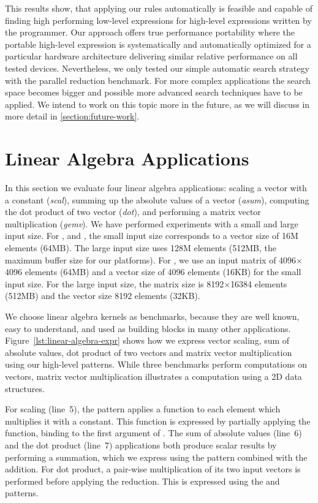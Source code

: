 \bigskip

\noindent
This results show, that applying our rules automatically is feasible and capable of finding high performing low-level expressions for high-level expressions written by the programmer.
Our approach offers true performance portability where the portable high-level expression is systematically and automatically optimized for a particular hardware architecture delivering similar relative performance on all tested devices.
Nevertheless, we only tested our simple automatic search strategy with the parallel reduction benchmark.
For more complex applications the search space becomes bigger and possible more advanced search techniques have to be applied.
We intend to work on this topic more in the future, as we will discuss in more detail in \autoref{section:future-work}.




\section{Linear Algebra Applications}

In this section we evaluate four linear algebra applications: scaling a vector with a constant (\emph{scal}), summing up the absolute values of a vector (\emph{asum}), computing the dot product of two vector (\emph{dot}), and performing a matrix vector multiplication (\emph{gemv}).
We have performed experiments with a small and large input size.
For ,  and , the small input size corresponds to a vector size of 16M elements (64MB).
The large input size uses 128M elements (512MB, the maximum \OpenCL buffer size for our platforms).
For , we use an input matrix of 4096$\times$4096 elements (64MB) and a vector size of 4096 elements (16KB) for the small input size.
For the large input size, the matrix size is 8192$\times$16384 elements (512MB) and the vector size 8192 elements (32KB).

We choose linear algebra kernels as benchmarks, because they are well known, easy to understand, and used as building blocks in many other applications.
Figure~\ref{lst:linear-algebra-expr} shows how we express vector scaling, sum of absolute values, dot product of two vectors and matrix vector multiplication using our high-level patterns.
While three benchmarks perform computations on vectors, matrix vector multiplication illustrates a computation using a 2D data structures.

For scaling (line~5), the  pattern applies a function to each element which multiplies it with a constant.
This function is expressed by partially applying the  function, \ie binding  to the first argument of .
The sum of absolute values (line~6) and the dot product (line~7) applications both produce scalar results by performing a summation, which we express using the  pattern combined with the addition.
For dot product, a pair-wise multiplication of its two input vectors is performed before applying the reduction.
This is expressed using the  and  patterns.

